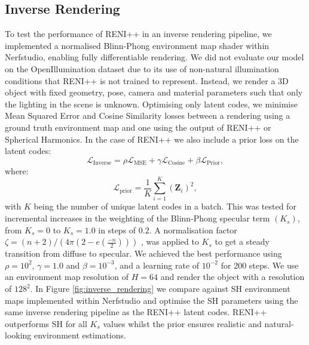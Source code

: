 \subsection{Inverse Rendering}
\label{Inverse Rendering} 

To test the performance of RENI++ in an inverse rendering pipeline, we implemented a normalised Blinn-Phong environment map shader within Nerfstudio, enabling fully differentiable rendering. We did not evaluate our model on the OpenIllumination dataset \cite{isabellaliulinghaochenOpenIlluminationMultiIlluminationDataset2023} due to its use of non-natural illumination conditions that RENI++ is not trained to represent. Instead, we render a 3D object with fixed geometry, pose, camera and material parameters such that only the lighting in the scene is unknown. Optimising only latent codes, we minimise Mean Squared Error and Cosine Similarity losses between a rendering using a ground truth environment map and one using the output of RENI++ or Spherical Harmonics. In the case of RENI++ we also include a prior loss on the latent codes:
\begin{equation}\label{inverse_loss}
    \mathcal{L}_{\text{Inverse}} = \rho \mathcal{L}_{\text{MSE}} + \gamma \mathcal{L}_{\text{Cosine}} + \beta \mathcal{L}_{\text{Prior}},
\end{equation}
where:
\begin{equation}\label{prior_loss}
    \mathcal{L}_{\text{prior}} = \frac{1}{K} \sum_{i=1}^K \left( \mathbf{Z}_i \right)^2,
\end{equation}
with $K$ being the number of unique latent codes in a batch.
This was tested for incremental increases in the weighting of the Blinn-Phong specular term $(K_{s})$, from $K_{s} = 0$ to $K_{s} = 1.0$ in steps of $0.2$. A normalisation factor \(\zeta = (n+2) / (4\pi(2-e(\frac{-n}{2})))\) \cite{gotanda_physically-based_2010}, was applied to $K_{s}$ to get a steady transition from diffuse to specular. We achieved the best performance using $\rho = 10^{2}$, $\gamma = 1.0$ and $\beta = 10^{-3}$, and a learning rate of \(10^{-2}\) for 200 steps. We use an environment map resolution of $H=64$ and render the object with a resolution of $128^{2}$. In Figure \ref{fig:inverse_rendering} we compare against SH environment maps implemented within Nerfstudio and optimise the SH parameters using the same inverse rendering pipeline as the RENI++ latent codes. RENI++ outperforms SH for all $K_{s}$ values whilst the prior ensures realistic and natural-looking environment estimations.

